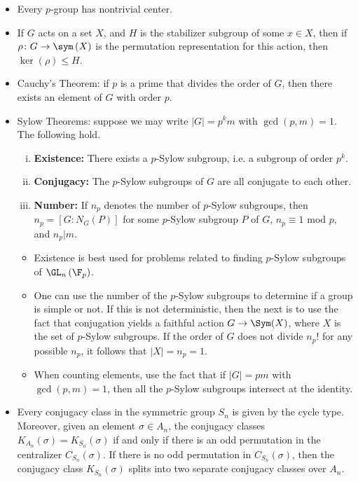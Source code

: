 \documentclass[10pt]{mypackage}
\begin{document}
\begin{itemize}
    The subgroups $\left[ G,G \right]$ and $Z(G)$ are characteristic in $G$.
  \item Every $p$-group has nontrivial center.
  \item If $G$ acts on a set $X$, and $H$ is the stabilizer subgroup of some $x\in X$, then if $\rho\colon G\rightarrow \sym\left( X \right)$ is the permutation representation for this action, then $\ker\left( \rho \right) \leq H$.
  \item Cauchy's Theorem: if $p$ is a prime that divides the order of $G$, then there exists an element of $G$ with order $p$.
  \item Sylow Theorems: suppose we may write $ \left\vert G \right\vert = p^{k}m $ with $\gcd\left( p,m \right) = 1$. The following hold.
    \begin{enumerate}[(i)]
      \item \textbf{Existence:} There exists a $p$-Sylow subgroup, i.e. a subgroup of order $p^{k}$.
      \item \textbf{Conjugacy:} The $p$-Sylow subgroups of $G$ are all conjugate to each other.
      \item \textbf{Number:} If $n_p$ denotes the number of $p$-Sylow subgroups, then $n_p = \left[ G:N_G(P) \right]$ for some $p$-Sylow subgroup $P$ of $G$, $n_p \equiv 1$ mod $p$, and $n_p | m$.
    \end{enumerate}
    \begin{itemize}
      \item Existence is best used for problems related to finding $p$-Sylow subgroups of $\GL_n\left( \F_p \right)$.
      \item One can use the number of the $p$-Sylow subgroups to determine if a group is simple or not. If this is not deterministic, then the next is to use the fact that conjugation yields a faithful action $G\rightarrow\Sym(X)$, where $X$ is the set of $p$-Sylow subgroups. If the order of $G$ does not divide $n_p!$ for any possible $n_p$, it follows that $\left\vert X \right\vert = n_p = 1$.
      \item When counting elements, use the fact that if $\left\vert G \right\vert = pm$ with $\gcd \left( p,m \right) = 1$, then all the $p$-Sylow subgroups intersect at the identity.
    \end{itemize}
  \item Every conjugacy class in the symmetric group $S_n$ is given by the cycle type. Moreover, given an element $\sigma\in A_n$, the conjugacy classes $K_{A_n}\left(\sigma\right) = K_{S_n}\left(\sigma\right)$ if and only if there is an odd permutation in the centralizer $C_{S_n}\left(\sigma\right)$. If there is no odd permutation in $C_{S_n}\left(\sigma\right)$, then the conjugacy class $K_{S_n}\left(\sigma\right)$ splits into two separate conjugacy classes over $A_n$.

\end{itemize}
\end{document}

